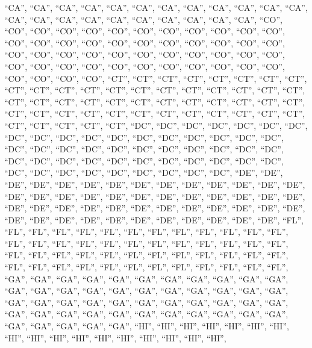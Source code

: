 \documentclass[
]{article}
\begin{document}
``CA'', ``CA'', ``CA'', ``CA'', ``CA'', ``CA'', ``CA'', ``CA'', ``CA'',
``CA'', ``CA'', ``CA'', ``CA'', ``CA'', ``CA'', ``CA'', ``CA'', ``CA'',
``CA'', ``CA'', ``CA'', ``CA'', ``CO'', ``CO'', ``CO'', ``CO'', ``CO'',
``CO'', ``CO'', ``CO'', ``CO'', ``CO'', ``CO'', ``CO'', ``CO'', ``CO'',
``CO'', ``CO'', ``CO'', ``CO'', ``CO'', ``CO'', ``CO'', ``CO'', ``CO'',
``CO'', ``CO'', ``CO'', ``CO'', ``CO'', ``CO'', ``CO'', ``CO'', ``CO'',
``CO'', ``CO'', ``CO'', ``CO'', ``CO'', ``CO'', ``CO'', ``CO'', ``CO'',
``CO'', ``CO'', ``CO'', ``CO'', ``CO'', ``CO'', ``CO'', ``CO'', ``CT'',
``CT'', ``CT'', ``CT'', ``CT'', ``CT'', ``CT'', ``CT'', ``CT'', ``CT'',
``CT'', ``CT'', ``CT'', ``CT'', ``CT'', ``CT'', ``CT'', ``CT'', ``CT'',
``CT'', ``CT'', ``CT'', ``CT'', ``CT'', ``CT'', ``CT'', ``CT'', ``CT'',
``CT'', ``CT'', ``CT'', ``CT'', ``CT'', ``CT'', ``CT'', ``CT'', ``CT'',
``CT'', ``CT'', ``CT'', ``CT'', ``CT'', ``CT'', ``CT'', ``CT'', ``CT'',
``CT'', ``CT'', ``CT'', ``DC'', ``DC'', ``DC'', ``DC'', ``DC'', ``DC'',
``DC'', ``DC'', ``DC'', ``DC'', ``DC'', ``DC'', ``DC'', ``DC'', ``DC'',
``DC'', ``DC'', ``DC'', ``DC'', ``DC'', ``DC'', ``DC'', ``DC'', ``DC'',
``DC'', ``DC'', ``DC'', ``DC'', ``DC'', ``DC'', ``DC'', ``DC'', ``DC'',
``DC'', ``DC'', ``DC'', ``DC'', ``DC'', ``DC'', ``DC'', ``DC'', ``DC'',
``DC'', ``DC'', ``DC'', ``DC'', ``DC'', ``DC'', ``DC'', ``DE'', ``DE'',
``DE'', ``DE'', ``DE'', ``DE'', ``DE'', ``DE'', ``DE'', ``DE'', ``DE'',
``DE'', ``DE'', ``DE'', ``DE'', ``DE'', ``DE'', ``DE'', ``DE'', ``DE'',
``DE'', ``DE'', ``DE'', ``DE'', ``DE'', ``DE'', ``DE'', ``DE'', ``DE'',
``DE'', ``DE'', ``DE'', ``DE'', ``DE'', ``DE'', ``DE'', ``DE'', ``DE'',
``DE'', ``DE'', ``DE'', ``DE'', ``DE'', ``DE'', ``DE'', ``DE'', ``DE'',
``DE'', ``DE'', ``FL'', ``FL'', ``FL'', ``FL'', ``FL'', ``FL'', ``FL'',
``FL'', ``FL'', ``FL'', ``FL'', ``FL'', ``FL'', ``FL'', ``FL'', ``FL'',
``FL'', ``FL'', ``FL'', ``FL'', ``FL'', ``FL'', ``FL'', ``FL'', ``FL'',
``FL'', ``FL'', ``FL'', ``FL'', ``FL'', ``FL'', ``FL'', ``FL'', ``FL'',
``FL'', ``FL'', ``FL'', ``FL'', ``FL'', ``FL'', ``FL'', ``FL'', ``FL'',
``FL'', ``FL'', ``FL'', ``FL'', ``FL'', ``FL'', ``GA'', ``GA'', ``GA'',
``GA'', ``GA'', ``GA'', ``GA'', ``GA'', ``GA'', ``GA'', ``GA'', ``GA'',
``GA'', ``GA'', ``GA'', ``GA'', ``GA'', ``GA'', ``GA'', ``GA'', ``GA'',
``GA'', ``GA'', ``GA'', ``GA'', ``GA'', ``GA'', ``GA'', ``GA'', ``GA'',
``GA'', ``GA'', ``GA'', ``GA'', ``GA'', ``GA'', ``GA'', ``GA'', ``GA'',
``GA'', ``GA'', ``GA'', ``GA'', ``GA'', ``GA'', ``GA'', ``GA'', ``GA'',
``GA'', ``HI'', ``HI'', ``HI'', ``HI'', ``HI'', ``HI'', ``HI'', ``HI'',
``HI'', ``HI'', ``HI'', ``HI'', ``HI'', ``HI'', ``HI'', ``HI'', ``HI'',
\end{document}
